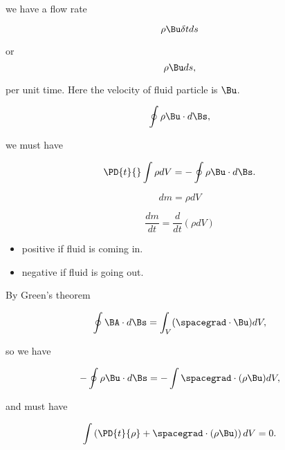 we have a flow rate

\begin{equation}\label{eqn:continuumL9:310}
\rho \Bu \delta t ds
\end{equation}

or 
\begin{equation}\label{eqn:continuumL9:330}
\rho \Bu ds,
\end{equation}

per unit time.  Here the velocity of fluid particle is $\Bu$.

\begin{equation}\label{eqn:continuumL9:350}
\oint \rho \Bu \cdot d\Bs,
\end{equation}

we must have

\begin{equation}\label{eqn:continuumL9:n}
\PD{t}{} \int \rho dV 
=
-\oint \rho \Bu \cdot d\Bs.
\end{equation}

\begin{equation}\label{eqn:continuumL9:370}
dm = \rho dV
\end{equation}

\begin{equation}\label{eqn:continuumL9:390}
\frac{dm}{dt} = \frac{d}{dt} (\rho dV)
\end{equation}

\begin{itemize}
\item 
positive if fluid is coming in.
\item 
negative if fluid is going out.
\end{itemize}

By Green's theorem

\begin{equation}\label{eqn:continuumL9:410}
\oint \BA \cdot d\Bs = \int_V (\spacegrad \cdot \Bu) dV,
\end{equation}

so we have

\begin{equation}\label{eqn:continuumL9:430}
-\oint \rho \Bu \cdot d\Bs = -\int \spacegrad \cdot (\rho \Bu ) dV,
\end{equation}

and must have

\begin{equation}\label{eqn:continuumL9:450}
\int \left( \PD{t}{\rho} + \spacegrad \cdot (\rho \Bu) \right) dV = 0.
\end{equation}

